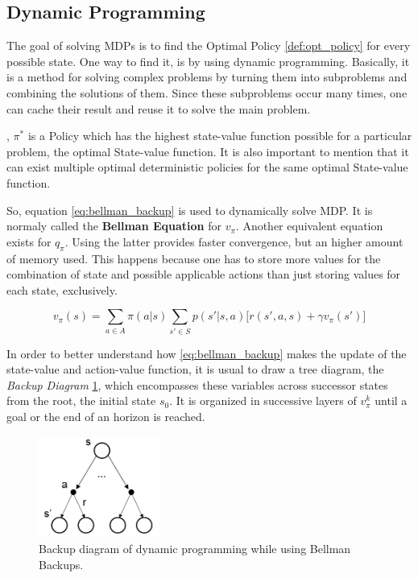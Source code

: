 \subsection{Dynamic Programming}

The goal of solving \glspl{MDP} is to find the Optimal Policy
\ref{def:opt_policy} for every possible state. One way to find it, is by using
dynamic programming. Basically, it is a method for solving complex problems by
turning them into subproblems and combining the solutions of them. Since these
subproblems occur many times, one can cache their result and reuse it to solve
the main problem.

\begin{definition}, $\pi^*$ is a Policy which has the highest
state-value function possible for a particular problem, the optimal State-value
function.
It is also important to mention that it can exist multiple optimal deterministic
policies for the same optimal State-value function.
\label{def:opt_policy}
\end{definition}

So, equation \ref{eq:bellman_backup} is used to dynamically solve \gls{MDP}. It is
normaly called the \textbf{Bellman Equation} for $v_{\pi}$. Another equivalent
equation exists for $q_{\pi}$. Using the latter provides faster convergence, but
an higher amount of memory used. This happens because one has to store more values
for the combination of state and possible applicable actions than just storing
values for each state, exclusively.

\begin{equation}
    v_{\pi}(s) = \sum_{a \in A} \pi(a|s) \sum_{s' \in S} p(s'|s,a)
    \big[r(s',a,s) + \gamma v_{\pi}(s') \big]
    \label{eq:bellman_backup}
\end{equation}

In order to better understand how \ref{eq:bellman_backup} makes the update of
the state-value and action-value function, it is usual to draw a tree diagram,
the \textit{Backup Diagram} \ref{fig:backup_diagram}, which encompasses these
variables across successor states from the root, the initial state $s_0$. It is
organized in successive layers of $v_{\pi}^k$ until a goal or the end of an
horizon is reached.

\begin{figure}[H]
    \centering
        \includegraphics[width=4cm]{images/backupdiagram}
        \caption{Backup diagram of dynamic programming while using Bellman
        Backups.}
        \label{fig:backup_diagram}
\end{figure}

